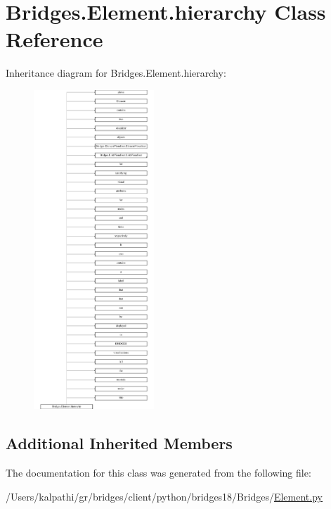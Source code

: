 \hypertarget{class_bridges_1_1_element_1_1hierarchy}{}\section{Bridges.\+Element.\+hierarchy Class Reference}
\label{class_bridges_1_1_element_1_1hierarchy}
Inheritance diagram for Bridges.\+Element.\+hierarchy\+:\begin{figure}[H]
\begin{center}
\leavevmode
\includegraphics[height=12.000000cm]{class_bridges_1_1_element_1_1hierarchy}
\end{center}
\end{figure}
\subsection*{Additional Inherited Members}


The documentation for this class was generated from the following file\+:\begin{DoxyCompactItemize}
\item 
/\+Users/kalpathi/gr/bridges/client/python/bridges18/\+Bridges/\mbox{\hyperlink{_element_8py}{Element.\+py}}\end{DoxyCompactItemize}
